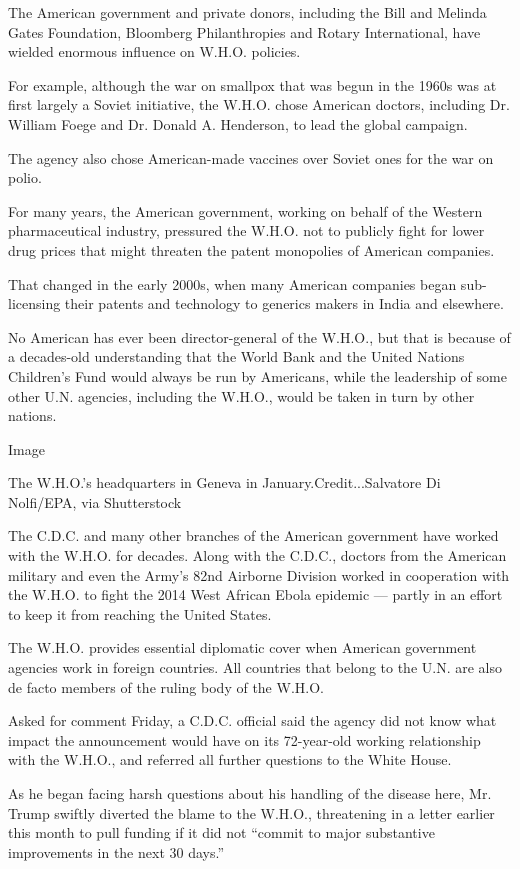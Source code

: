 The American government and private donors, including the Bill and
Melinda Gates Foundation, Bloomberg Philanthropies and Rotary
International, have wielded enormous influence on W.H.O. policies.

For example, although the war on smallpox that was begun in the 1960s
was at first largely a Soviet initiative, the W.H.O. chose American
doctors, including Dr. William Foege and Dr. Donald A. Henderson, to
lead the global campaign.

The agency also chose American-made vaccines over Soviet ones for the
war on polio.

For many years, the American government, working on behalf of the
Western pharmaceutical industry, pressured the W.H.O. not to publicly
fight for lower drug prices that might threaten the patent monopolies of
American companies.

That changed in the early 2000s, when many American companies began
sub-licensing their patents and technology to generics makers in India
and elsewhere.

No American has ever been director-general of the W.H.O., but that is
because of a decades-old understanding that the World Bank and the
United Nations Children's Fund would always be run by Americans, while
the leadership of some other U.N. agencies, including the W.H.O., would
be taken in turn by other nations.

Image

The W.H.O.'s headquarters in Geneva in January.Credit...Salvatore Di
Nolfi/EPA, via Shutterstock

The C.D.C. and many other branches of the American government have
worked with the W.H.O. for decades. Along with the C.D.C., doctors from
the American military and even the Army's 82nd Airborne Division worked
in cooperation with the W.H.O. to fight the 2014 West African Ebola
epidemic --- partly in an effort to keep it from reaching the United
States.

The W.H.O. provides essential diplomatic cover when American government
agencies work in foreign countries. All countries that belong to the
U.N. are also de facto members of the ruling body of the W.H.O.

Asked for comment Friday, a C.D.C. official said the agency did not know
what impact the announcement would have on its 72-year-old working
relationship with the W.H.O., and referred all further questions to the
White House.

As he began facing harsh questions about his handling of the disease
here, Mr. Trump swiftly diverted the blame to the W.H.O., threatening in
a letter earlier this month to pull funding if it did not ``commit to
major substantive improvements in the next 30 days.''

